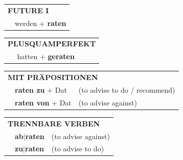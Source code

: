 \documentclass[10pt,a4paper]{revtex4-2}
\begin{document}
\begin{verbbox-dat}
\begin{tabular}{rl}
    \multicolumn{2}{l}{\textbf{FUTURE I} }\\
   & werden + \textbf{raten}\\
 
  \end{tabular}
\hfill
   \begin{tabular}{rl}
      \multicolumn{2}{l}{\textbf{PLUSQUAMPERFEKT}}\\
   & hatten + \textbf{geraten}\\
  \end{tabular}

   \vspace{10pt}

   \begin{tabular}{lll}
      \multicolumn{3}{l}{\textbf{MIT PRÄPOSITIONEN}}\\
& \textbf{raten zu} + Dat & (to advise to do / recommend)\\
& \textbf{raten von} + Dat & (to advise against)\\
\end{tabular}
  \hfill
   \begin{tabular}{lll}
      \multicolumn{3}{l}{\textbf{TRENNBARE VERBEN}}\\
 & \textbf{ab$|$raten} & (to advise against)\\
 & \textbf{zu$|$raten} & (to advise to do)\\
  \end{tabular}


  \vspace{-5pt}


\end{verbbox-dat}
\end{document}
